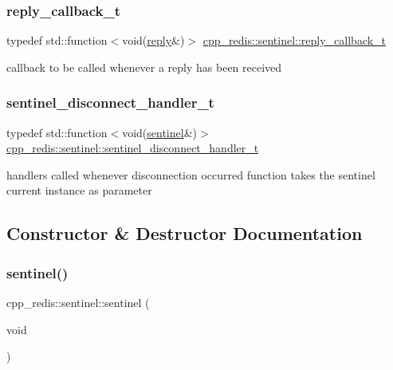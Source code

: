 \subsubsection{\texorpdfstring{reply\+\_\+callback\+\_\+t}{reply\_callback\_t}}
{\footnotesize\ttfamily typedef std\+::function$<$void(\hyperlink{classcpp__redis_1_1reply}{reply}\&)$>$ \hyperlink{classcpp__redis_1_1sentinel_ae1a150ff8787208c47414397a061c9a7}{cpp\+\_\+redis\+::sentinel\+::reply\+\_\+callback\+\_\+t}}

callback to be called whenever a reply has been received \mbox{\label{classcpp__redis_1_1sentinel_a923e06b5b700c16dffec8a01d2fa9aa4}} 
\subsubsection{\texorpdfstring{sentinel\+\_\+disconnect\+\_\+handler\+\_\+t}{sentinel\_disconnect\_handler\_t}}
{\footnotesize\ttfamily typedef std\+::function$<$void(\hyperlink{classcpp__redis_1_1sentinel}{sentinel}\&)$>$ \hyperlink{classcpp__redis_1_1sentinel_a923e06b5b700c16dffec8a01d2fa9aa4}{cpp\+\_\+redis\+::sentinel\+::sentinel\+\_\+disconnect\+\_\+handler\+\_\+t}}

handlers called whenever disconnection occurred function takes the sentinel current instance as parameter 

\subsection{Constructor \& Destructor Documentation}
\mbox{\label{classcpp__redis_1_1sentinel_a2ea5a80a9139d5192706988521a2ae34}} 
\subsubsection{\texorpdfstring{sentinel()}{sentinel()}\hspace{0.1cm}{\footnotesize\ttfamily [1/2]}}
{\footnotesize\ttfamily cpp\+\_\+redis\+::sentinel\+::sentinel (\begin{DoxyParamCaption}\item[{void}]{ }\end{DoxyParamCaption})}



